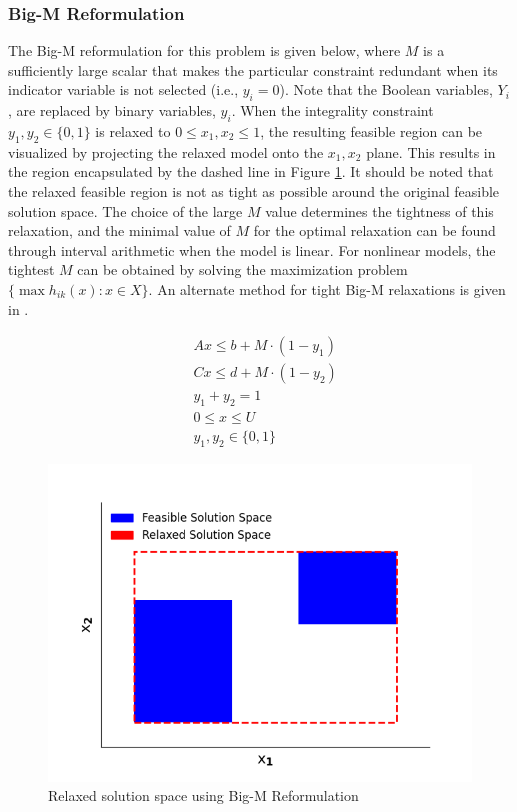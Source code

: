 \documentclass{juliacon}
\begin{document}
 \subsubsection{Big-M Reformulation}
 The Big-M reformulation for this problem is given below, where $M$ is a sufficiently large scalar that makes the particular constraint redundant when its indicator variable is not selected (i.e., $y_i = 0$). Note that the Boolean variables, $Y_i$, are replaced by binary variables, $y_i$. When the integrality constraint $y_1,y_2 \in \{0,1\}$ is relaxed to $0 \leq x_1, x_2 \leq 1$, the resulting feasible region can be visualized by projecting the relaxed model onto the $x_1, x_2$ plane. This results in the region encapsulated by the dashed line in Figure \ref{fig:bigm}. It should be noted that the relaxed feasible region is not as tight as possible around the original feasible solution space. The choice of the large $M$ value determines the tightness of this relaxation, and the minimal value of $M$ for the optimal relaxation can be found through interval arithmetic when the model is linear. For nonlinear models, the tightest $M$ can be obtained by solving the maximization problem $\{\max h_{ik}(x): x \in X\}$. An alternate method for tight Big-M relaxations is given in \cite{TRESPALACIOS201598}.

\begin{align*}
    & Ax \leq b + M \cdot (1 - y_1) \\
    & Cx \leq d + M \cdot (1 - y_2) \\
    & y_1 + y_2 = 1 \\
    & 0 \leq x \leq U \\
    & y_1, y_2 \in \{0,1\}
\end{align*}

\begin{figure}
    \centering
    \includegraphics[scale=0.5]{bigm.png}
    \caption{Relaxed solution space using Big-M Reformulation}
    \label{fig:bigm}
\end{figure}
\end{document}
